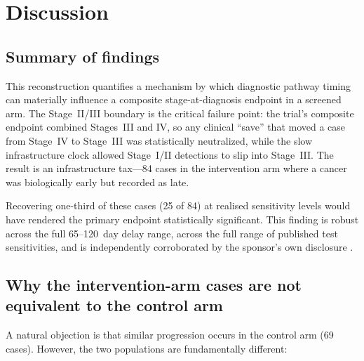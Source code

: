 \documentclass[11pt,letter]{article}
\begin{document}
\section{Discussion}
\label{sec:discussion}

\subsection{Summary of findings}

This reconstruction quantifies a mechanism by which diagnostic pathway
timing can materially influence a composite stage-at-diagnosis endpoint
in a screened arm. The Stage~II/III boundary is the critical failure point:
the trial's composite endpoint combined Stages~III and IV, so any clinical
``save'' that moved a case from Stage~IV to Stage~III was statistically
neutralized, while the slow infrastructure clock allowed Stage~I/II
detections to slip into Stage~III. The result is an infrastructure
tax---84 cases in the intervention arm where a cancer was biologically
early but recorded as late.

Recovering one-third of these cases (25 of 84) at realised sensitivity
levels would have rendered the
primary endpoint statistically significant. This finding is robust across
the full 65--120~day delay range, across the full range of published test
sensitivities, and is independently corroborated by the sponsor's own
disclosure \cite{GRAIL2026}.


\subsection{Why the intervention-arm cases are not equivalent to the control arm}

A natural objection is that similar progression occurs in the control arm
(69 cases). However, the two populations are fundamentally different:
\end{document}
